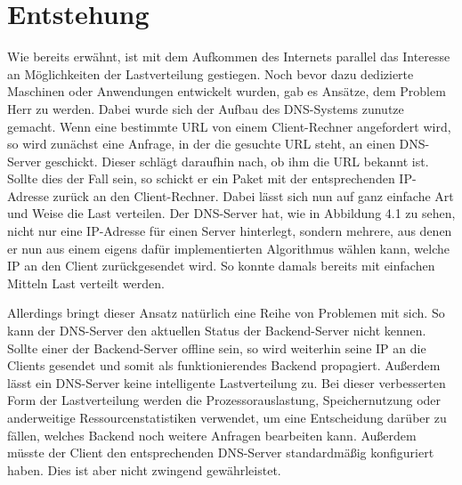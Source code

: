 \section{Entstehung}

Wie bereits erwähnt, ist mit dem Aufkommen des Internets parallel das Interesse an Möglichkeiten der Lastverteilung gestiegen. Noch bevor dazu dedizierte Maschinen oder Anwendungen entwickelt wurden, gab es Ansätze, dem Problem Herr zu werden. Dabei wurde sich der Aufbau des DNS-Systems zunutze gemacht. Wenn eine bestimmte URL von einem Client-Rechner angefordert wird, so wird zunächst eine Anfrage, in der die gesuchte URL steht, an einen DNS-Server geschickt. Dieser schlägt daraufhin nach, ob ihm die URL bekannt ist. Sollte dies der Fall sein, so schickt er ein Paket mit der entsprechenden IP-Adresse zurück an den Client-Rechner. Dabei lässt sich nun auf ganz einfache Art und Weise die Last verteilen. Der DNS-Server hat, wie in Abbildung 4.1 zu sehen, nicht nur eine IP-Adresse für einen Server hinterlegt, sondern mehrere, aus denen er nun aus einem eigens dafür implementierten Algorithmus wählen kann, welche IP an den Client zurückgesendet wird. So konnte damals bereits mit einfachen Mitteln Last verteilt werden. 

Allerdings bringt dieser Ansatz natürlich eine Reihe von Problemen mit sich. So kann der DNS-Server den aktuellen Status der Backend-Server nicht kennen. Sollte einer der Backend-Server offline sein, so wird weiterhin seine IP an die Clients gesendet und somit als funktionierendes Backend propagiert. Außerdem lässt ein DNS-Server keine intelligente Lastverteilung zu. Bei dieser verbesserten Form der Lastverteilung werden die Prozessorauslastung, Speichernutzung oder anderweitige Ressourcenstatistiken verwendet, um eine Entscheidung darüber zu fällen, welches Backend noch weitere Anfragen bearbeiten kann. Außerdem müsste der Client den entsprechenden DNS-Server standardmäßig konfiguriert haben. Dies ist aber nicht zwingend gewährleistet.

